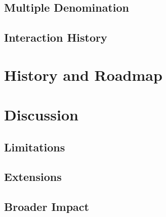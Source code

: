 \documentclass[11pt,a4paper]{article}
\begin{document}
\subsection{Multiple Denomination}

\subsection{Interaction History}

\section{History and Roadmap}

\section{Discussion}

\subsection{Limitations}

\subsection{Extensions}

\subsection{Broader Impact}
\end{document}
